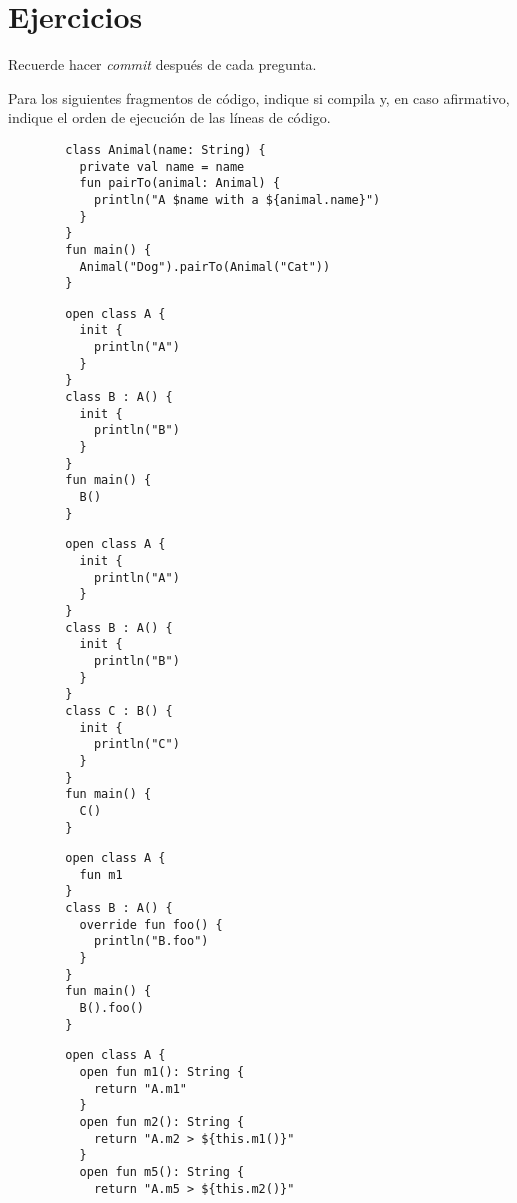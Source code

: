 \newpage
\section{Ejercicios}
  \label{sec:oop:principios:ejercicios}
  \begin{important}
    Recuerde hacer \textit{commit} después de cada pregunta.
  \end{important}

  \begin{Exercise}[title={Orden de ejecución}]
    Para los siguientes fragmentos de código, indique si compila y, en caso afirmativo, indique el
    orden de ejecución de las líneas de código.
    
    \Question 
      \begin{verbatim}
        class Animal(name: String) {
          private val name = name
          fun pairTo(animal: Animal) {
            println("A $name with a ${animal.name}")
          }
        }
        fun main() {
          Animal("Dog").pairTo(Animal("Cat"))
        }
      \end{verbatim}
    \Question 
      \begin{verbatim}
        open class A {
          init {
            println("A")
          }
        }
        class B : A() {
          init {
            println("B")
          }
        }
        fun main() {
          B()
        }
      \end{verbatim}
    \Question 
      \begin{verbatim}
        open class A {
          init {
            println("A")
          }
        }
        class B : A() {
          init {
            println("B")
          }
        }
        class C : B() {
          init {
            println("C")
          }
        }
        fun main() {
          C()
        }
      \end{verbatim}
    \Question 
      \begin{verbatim}
        open class A {
          fun m1
        }
        class B : A() {
          override fun foo() {
            println("B.foo")
          }
        }
        fun main() {
          B().foo()
        }
      \end{verbatim}
    \Question
      \begin{verbatim}
        open class A {
          open fun m1(): String {
            return "A.m1"
          }
          open fun m2(): String {
            return "A.m2 > ${this.m1()}"
          }
          open fun m5(): String {
            return "A.m5 > ${this.m2()}"

\end{verbatim}
\end{Exercise}
